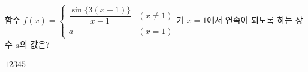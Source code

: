 함수 $f(x)=\begin{cases} \dfrac{\sin\{3(x-1)\}}{x-1} & (x\ne 1) \\ a & (x=1) \end{cases}$가 $x=1$에서 연속이 되도록 하는 상수 $a$의 값은?
\begin{choices32}{$1$}{$2$}{$3$}{$4$}{$5$}\end{choices32}
